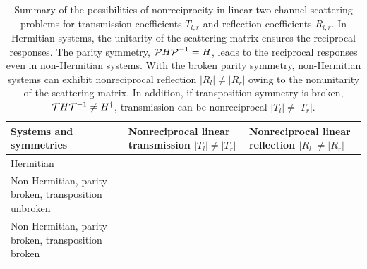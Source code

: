 \documentclass{tADP2e}
\theoremstyle{plain}
\newcommand{\cmark}{\ding{51}}%
\newcommand{\xmark}{\ding{55}}%
\theoremstyle{plain}
\theoremstyle{definition}
\begin{document}
\begin{table}[b]
\caption{\label{tablenonrec} Summary of the possibilities of nonreciprocity in linear two-channel scattering problems for transmission coefficients $T_{l,r}$ and reflection coefficients $R_{l,r}$. In Hermitian systems, the unitarity of the scattering matrix ensures the reciprocal responses. The parity symmetry, ${\cal P}H{\cal P}^{-1}=H$, leads to the reciprocal responses even in non-Hermitian systems. With the broken parity symmetry, non-Hermitian systems can exhibit  nonreciprocal reflection $|R_l|\neq|R_r|$ owing to the nonunitarity of the scattering matrix. In addition, if transposition symmetry is broken, ${\cal T}H{\cal T}^{-1}\neq H^\dagger$, transmission can be nonreciprocal $|T_l|\neq|T_r|$. }
\footnotesize
\begin{tabular}{@{}  >{\centering\arraybackslash} m{6.1cm}@{}  >{\centering\arraybackslash} m{4.2cm} @{}  >{\centering\arraybackslash} m{4.2cm}}
\midrule \midrule
Systems and symmetries & Nonreciprocal linear transmission \newline $|T_l|\neq|T_r|$&Nonreciprocal linear reflection \newline $|R_l|\neq|R_r|$ \\ \midrule 
Hermitian & \xmark & \xmark
\\
Non-Hermitian, parity broken, transposition unbroken & \xmark &\cmark
\\
Non-Hermitian, parity broken, transposition broken & \cmark &\cmark
\\
\midrule \midrule
\end{tabular}
\end{table}
\end{document}
